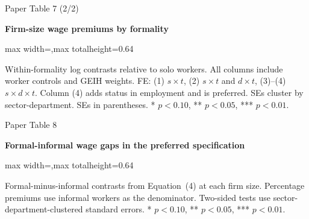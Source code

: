 \begin{frame}{Paper Table 7 (2/2)}
\begin{minipage}{\textwidth}\small\textbf{Firm-size wage premiums by formality}\end{minipage}\par\vspace{0.15cm}
\centering\begingroup\fontsize{8.5}{10}\selectfont
\setlength{\tabcolsep}{4pt}\renewcommand{\arraystretch}{1.06}
\begin{adjustbox}{max width=\textwidth,max totalheight=0.64\textheight}

\end{adjustbox}\endgroup\par\vspace{0.10cm}
{\fontsize{6.5}{7.5}\selectfont\raggedright Within-formality log contrasts relative to solo workers. All columns include worker controls and GEIH weights. FE: (1) $s\times t$, (2) $s\times t$ and $d\times t$, (3)--(4) $s\times d\times t$. Column (4) adds status in employment and is preferred. SEs cluster by sector-department. SEs in parentheses. * $p<0.10$, ** $p<0.05$, *** $p<0.01$.\par}
\end{frame}

\begin{frame}{Paper Table 8}
\begin{minipage}{\textwidth}\small\textbf{Formal-informal wage gaps in the preferred specification}\end{minipage}\par\vspace{0.15cm}
\centering\begingroup\fontsize{8.5}{10}\selectfont
\setlength{\tabcolsep}{4pt}\renewcommand{\arraystretch}{1.06}
\begin{adjustbox}{max width=\textwidth,max totalheight=0.64\textheight}

\end{adjustbox}\endgroup\par\vspace{0.10cm}
{\fontsize{6.5}{7.5}\selectfont\raggedright Formal-minus-informal contrasts from Equation~(4) at each firm size. Percentage premiums use informal workers as the denominator. Two-sided tests use sector-department-clustered standard errors. * $p<0.10$, ** $p<0.05$, *** $p<0.01$.\par}
\end{frame}

